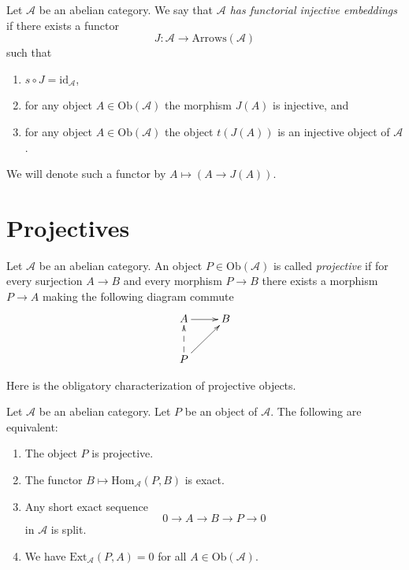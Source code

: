 \begin{definition}
\label{definition-functorial-injective-embedding}
Let $\mathcal{A}$ be an abelian category.
We say that {\it $\mathcal{A}$ has functorial injective embeddings}
if there exists a functor
$$
J : \mathcal{A} \longrightarrow \text{Arrows}(\mathcal{A})
$$
such that
\begin{enumerate}
\item $s \circ J = \text{id}_{\mathcal{A}}$,
\item for any object $A \in \text{Ob}(\mathcal{A})$
the morphism $J(A)$ is injective, and
\item for any object $A \in \text{Ob}(\mathcal{A})$
the object $t(J(A))$ is an injective object of $\mathcal{A}$.
\end{enumerate}
We will denote such a functor by
$A \mapsto (A \to J(A))$.
\end{definition}





\section{Projectives}
\label{section-projectives}

\begin{definition}
\label{definition-projective}
Let $\mathcal{A}$ be an abelian category.
An object $P \in \text{Ob}(\mathcal{A})$ is
called {\it projective} if for every surjection
$A \rightarrow B$ and every morphism
$P \to B$ there exists a morphism $P \to A$ making
the following diagram commute
$$
\xymatrix{
A \ar[r] & B \\
P \ar@{-->}[u] \ar[ru] &
}
$$
\end{definition}

\noindent
Here is the obligatory characterization of projective objects.

\begin{lemma}
\label{lemma-characterize-projectives}
Let $\mathcal{A}$ be an abelian category.
Let $P$ be an object of $\mathcal{A}$.
The following are equivalent:
\begin{enumerate}
\item The object $P$ is projective.
\item The functor $B \mapsto \text{Hom}_{\mathcal{A}}(P, B)$
is exact.
\item Any short exact sequence
$$
0 \to A \to B \to P \to 0
$$
in $\mathcal{A}$ is split.
\item We have $\text{Ext}_{\mathcal{A}}(P, A) = 0$ for
all $A \in \text{Ob}(\mathcal{A})$.
\end{enumerate}
\end{lemma}

